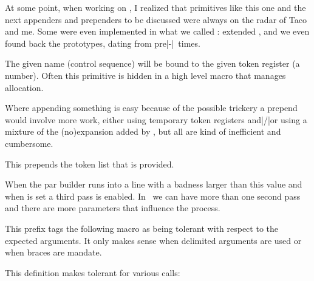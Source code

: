 \starttyping
\toksapp{}
\toksapp\scratchtoksone\scratchtokstwo
\stoptyping

At some point, when working on \LUAMETATEX, I realized that primitives like this
one and the next appenders and prependers to be discussed were always on the
radar of Taco and me. Some were even implemented in what we called :
extended \ETEX, and we even found back the prototypes, dating from pre|-|\PDFTEX\
times.

\stopnewprimitive

\startoldprimitive[title={\prm {toksdef}}]

The given name (control sequence) will be bound to the given token register (a
number). Often this primitive is hidden in a high level macro that manages
allocation.

\stopoldprimitive

\startnewprimitive[title={\prm {tokspre}}]

Where appending something is easy because of the possible 
trickery a prepend would involve more work, either using temporary token
registers and|/|or using a mixture of the (no)expansion added by \ETEX, but all
are kind of inefficient and cumbersome.

\starttyping
\tokspre{}
\tokspre\scratchtoksone\scratchtokstwo
\stoptyping

This prepends the token list that is provided.

\stopnewprimitive

\startoldprimitive[title={\prm {tolerance}}]

When the par builder runs into a line with a badness larger than this value and
when \prm {emergencystretch} is set a third pass is enabled. In \LUAMETATEX\ we
can have more than one second pass and there are more parameters that influence
the process.

\stopoldprimitive

\startnewprimitive[title={\prm {tolerant}}]

This prefix tags the following macro as being tolerant with respect to the
expected arguments. It only makes sense when delimited arguments are used or when
braces are mandate.

\startbuffer
\tolerant{}
\stopbuffer

\typebuffer \getbuffer

This definition makes \type {\foo} tolerant for various calls:

